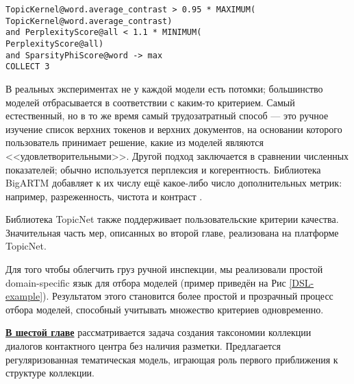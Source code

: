 \begin{figure*}[ht]
\captionsetup{justification=raggedright,singlelinecheck=false,format=hang}
\texttt{TopicKernel@word.average\_contrast > 0.95 * MAXIMUM( \\
\hphantom{\ \ \ \ \ \ \ \ }TopicKernel@word.average\_contrast) \\
\hphantom{\ \ } and PerplexityScore@all < 1.1 * MINIMUM( \\
\hphantom{\ \ \ \ \ \ \ \ }PerplexityScore@all) \\
\hphantom{\ \ } and SparsityPhiScore@word -> max\\
\hphantom{\ \ } COLLECT 3} \\
\caption{Пример строки, задающей критерий отбора моделей. Здесь в качестве критериев отбора участвуют перплексия, контраст лексического ядра модальности \texttt{@word} и разреженность матрицы $\Phi$. Результатом будут три модели, контраст которых не более чем на 5\% отличается от наилучшего достигнутого контраста, имеют допустимую перплексию и как можно более разреженны. }
\label{DSL-example}
\end{figure*} 

В реальных экспериментах не у каждой модели есть потомки; большинство моделей отбрасывается в соответствии с каким-то критерием. Самый естественный, но в то же время самый трудозатратный способ --- это ручное изучение список верхних токенов и верхних документов, на основании которого пользователь принимает решение, какие из моделей являются <<удовлетворительными>>. Другой подход заключается в сравнении численных показателей; обычно используется перплексия и когерентность. Библиотека \mbox{BigARTM} добавляет к их числу ещё какое-либо число дополнительных метрик: например, разреженность, чистота и контраст \cite{voron15mlj}.

Библиотека TopicNet также поддерживает пользовательские критерии качества. Значительная часть мер, описанных во второй главе, реализована на платформе TopicNet.  

Для того чтобы облегчить груз ручной инспекции, мы реализовали простой domain-specific язык для отбора моделей (пример приведён на Рис \ref{DSL-example}). Результатом этого становится более простой и прозрачный процесс отбора моделей, способный учитывать множество критериев одновременно.  

\underline{\textbf{В шестой главе}} рассматривается задача создания таксономии коллекции диалогов контактного центра без наличия разметки. Предлагается регуляризованная тематическая модель, играющая роль первого приближения к структуре коллекции.

